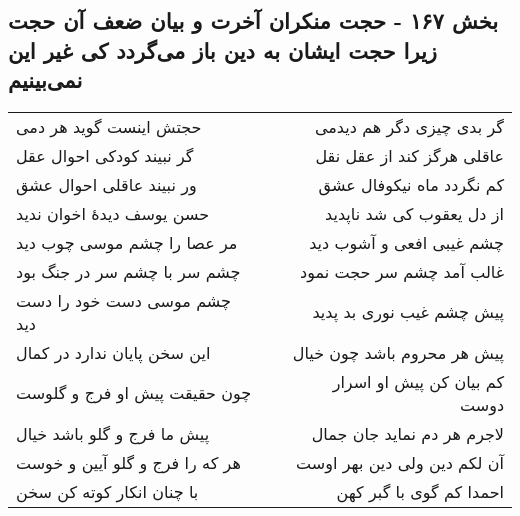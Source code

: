 \begin{center}
\section*{بخش ۱۶۷ - حجت منکران آخرت و بیان ضعف آن حجت زیرا حجت ایشان به دین باز می‌گردد کی غیر این نمی‌بینیم}
\label{sec:sh167}
\begin{longtable}{l p{0.5cm} r}
حجتش اینست گوید هر دمی
&&
گر بدی چیزی دگر هم دیدمی
\\
گر نبیند کودکی احوال عقل
&&
عاقلی هرگز کند از عقل نقل
\\
ور نبیند عاقلی احوال عشق
&&
کم نگردد ماه نیکوفال عشق
\\
حسن یوسف دیدهٔ اخوان ندید
&&
از دل یعقوب کی شد ناپدید
\\
مر عصا را چشم موسی چوب دید
&&
چشم غیبی افعی و آشوب دید
\\
چشم سر با چشم سر در جنگ بود
&&
غالب آمد چشم سر حجت نمود
\\
چشم موسی دست خود را دست دید
&&
پیش چشم غیب نوری بد پدید
\\
این سخن پایان ندارد در کمال
&&
پیش هر محروم باشد چون خیال
\\
چون حقیقت پیش او فرج و گلوست
&&
کم بیان کن پیش او اسرار دوست
\\
پیش ما فرج و گلو باشد خیال
&&
لاجرم هر دم نماید جان جمال
\\
هر که را فرج و گلو آیین و خوست
&&
آن لکم دین ولی دین بهر اوست
\\
با چنان انکار کوته کن سخن
&&
احمدا کم گوی با گبر کهن
\\
\end{longtable}
\end{center}
